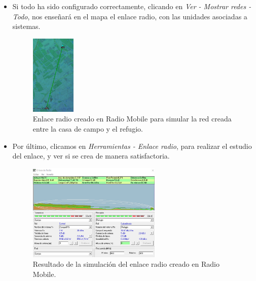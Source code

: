 \documentclass[12pt]{article}
\begin{document}
\begin{itemize}
		\item Si todo ha sido configurado correctamente, clicando en \textit{Ver - Mostrar redes - Todo}, nos enseñará en el mapa el enlace radio, con las unidades asociadas a sistemas.
		
		\begin{figure}[h]
			\begin{center}
				\includegraphics[width=0.2\textwidth]{img/mostrarRed_radioMobile.png}
				\caption{Enlace radio creado en Radio Mobile para simular la red creada entre la casa de campo y el refugio.}
				\label{fig: mostrar red radio mobile}
			\end{center}
		\end{figure}
		
		\pagebreak
		
		\item Por último, clicamos en \textit{Herramientas - Enlace radio}, para realizar el estudio del enlace, y ver si se crea de manera satisfactoria. 
		
		
		\begin{figure}[h]
			\begin{center}
				\includegraphics[width=0.6\textwidth]{img/ejemplo_resultadoEnlace_radioMobile.png}
				\caption{Resultado de la simulación del enlace radio creado en Radio Mobile.}
				\label{fig: resultado enlace radio mobile}
			\end{center}
		\end{figure}
	\end{itemize}
\end{document}
